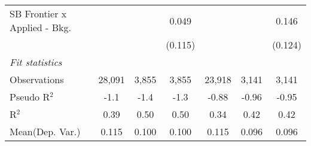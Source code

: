 \begin{tabular}{lcccccc}
   SB Frontier x Applied - Bkg.   &              &               & 0.049         &              &              & 0.146\\   
                                  &              &               & (0.115)       &              &              & (0.124)\\   
   \midrule
   \emph{Fit statistics}\\
   Observations                   & 28,091       & 3,855         & 3,855         & 23,918       & 3,141        & 3,141\\  
   Pseudo R$^2$                   & -1.1         & -1.4          & -1.3          & -0.88        & -0.96        & -0.95\\  
   R$^2$                          & 0.39         & 0.50          & 0.50          & 0.34         & 0.42         & 0.42\\  
Mean(Dep. Var.) & 0.115 & 0.100 & 0.100 & 0.115 & 0.096 & 0.096 \\
   

\end{tabular}
